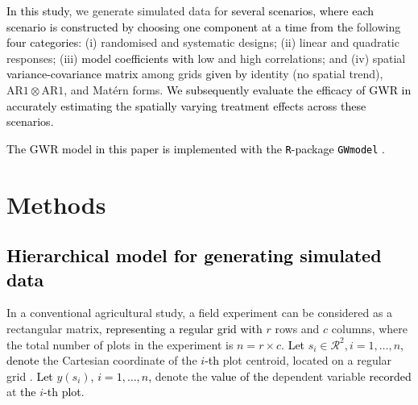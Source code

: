 \documentclass[a4paper]{article} 	%
\newcommand{\R}{\texttt{R}}
\newcommand{\Matern}{Mat\'ern }
\newcommand{\AR}{\mathrm{AR1}}
\newcommand{\revision}[1]{\textcolor{black}{#1}}
\newcommand{\zc}[1]{\textcolor{black}{#1}}
\begin{document}
\revision{In this study}, we generate simulated data for \revision{several scenarios, where each scenario is constructed by choosing one component at a time from the} following \revision{four categories}: (i) randomised and systematic designs; (ii) linear and quadratic responses; (iii) \revision{model coefficients with} low and high correlations; and (iv) spatial \revision{variance-covariance matrix} among grids \revision{given by} identity (no spatial trend), $\AR\otimes\AR$, and \Matern forms. \zc{We subsequently evaluate the efficacy of GWR in accurately estimating the spatially varying treatment effects across these scenarios.}

\revision{The GWR model in this paper is implemented with the \R-package \texttt{GWmodel} \parencite{lu2014gwmodel, Gollini2015GWmodel}.}

\section{Methods}\label{Sec:Meth}




\subsection{\revision{Hierarchical model for generating simulated data}}\label{sec:basic}

In a conventional agricultural study, a field experiment can be considered as a rectangular matrix\revision{, representing a regular grid with} $r$ rows and $c$ columns, where the total number of plots in the experiment is $n=r\times c$. \revision{Let} $s_i\in \mathcal{R}^2, i=1,\ldots,n$\revision{,} \revision{denote} the Cartesian coordinat\revision{e} of the \revision{$i$-th} plot centroid, located on a regular grid \parencite{Zimmerman1991Randoma}. \revision{Let} $y(s_i)$\revision{, $i=1,\ldots,n$,} denote the \revision{value of the} dependent variable \revision{recorded} at \revision{the} $i$\revision{-th plot}. 
	
\end{document}
